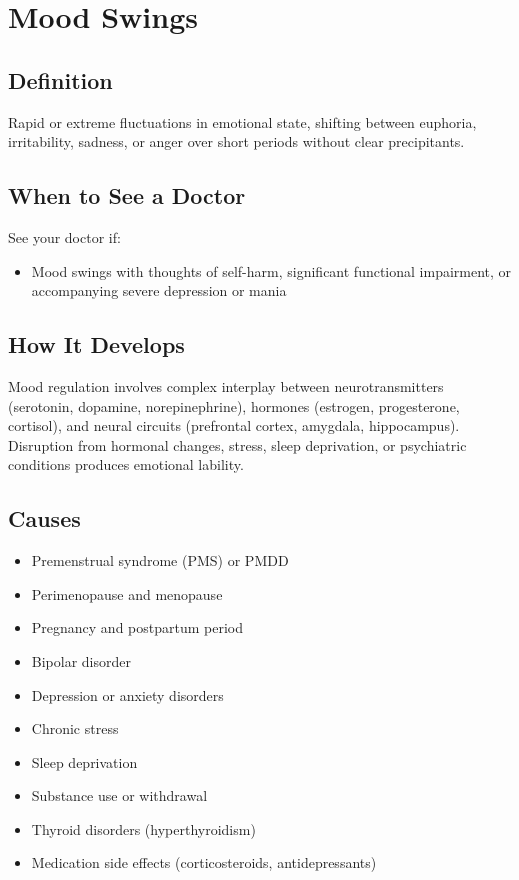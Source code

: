 \chapter{Mood Swings}

\section*{Definition}
Rapid or extreme fluctuations in emotional state, shifting between euphoria, irritability, sadness, or anger over short periods without clear precipitants.

\section*{When to See a Doctor}
See your doctor if:
\begin{itemize}
  \item Mood swings with thoughts of self-harm, significant functional impairment, or accompanying severe depression or mania
\end{itemize}

\section*{How It Develops}
Mood regulation involves complex interplay between neurotransmitters (serotonin, dopamine, norepinephrine), hormones (estrogen, progesterone, cortisol), and neural circuits (prefrontal cortex, amygdala, hippocampus). Disruption from hormonal changes, stress, sleep deprivation, or psychiatric conditions produces emotional lability.

\section*{Causes}
\begin{itemize}
  \item Premenstrual syndrome (PMS) or PMDD
  \item Perimenopause and menopause
  \item Pregnancy and postpartum period
  \item Bipolar disorder
  \item Depression or anxiety disorders
  \item Chronic stress
  \item Sleep deprivation
  \item Substance use or withdrawal
  \item Thyroid disorders (hyperthyroidism)
  \item Medication side effects (corticosteroids, antidepressants)
\end{itemize}

